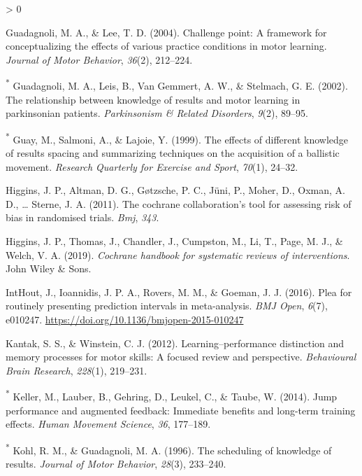 \documentclass[
  english,
  man, donotrepeattitle,mask,floatsintext]{apa7}
\newlength{\cslhangindent}
\newenvironment{CSLReferences}[2] %
 {%
  \setlength{\parindent}{0pt}
  \ifodd #1 \everypar{\setlength{\hangindent}{\cslhangindent}}\ignorespaces\fi
  \ifnum #2 > 0
  \setlength{\parskip}{#2\baselineskip}
  \fi
 }%
 {}
\begin{document}
\begin{CSLReferences}{1}{0}
\leavevmode\hypertarget{ref-Guadagnoli2004}{}%
Guadagnoli, M. A., \& Lee, T. D. (2004). Challenge point: A framework for conceptualizing the effects of various practice conditions in motor learning. \emph{Journal of Motor Behavior}, \emph{36}(2), 212--224.

\leavevmode\hypertarget{ref-Guadagnoli2002}{}%
\textsuperscript{*} Guadagnoli, M. A., Leis, B., Van Gemmert, A. W., \& Stelmach, G. E. (2002). The relationship between knowledge of results and motor learning in parkinsonian patients. \emph{Parkinsonism \& Related Disorders}, \emph{9}(2), 89--95.

\leavevmode\hypertarget{ref-Guay1999}{}%
\textsuperscript{*} Guay, M., Salmoni, A., \& Lajoie, Y. (1999). The effects of different knowledge of results spacing and summarizing techniques on the acquisition of a ballistic movement. \emph{Research Quarterly for Exercise and Sport}, \emph{70}(1), 24--32.

\leavevmode\hypertarget{ref-Higgins2011}{}%
Higgins, J. P., Altman, D. G., Gøtzsche, P. C., Jüni, P., Moher, D., Oxman, A. D., \ldots{} Sterne, J. A. (2011). The cochrane collaboration's tool for assessing risk of bias in randomised trials. \emph{Bmj}, \emph{343}.

\leavevmode\hypertarget{ref-Higgins2019}{}%
Higgins, J. P., Thomas, J., Chandler, J., Cumpston, M., Li, T., Page, M. J., \& Welch, V. A. (2019). \emph{Cochrane handbook for systematic reviews of interventions}. John Wiley \& Sons.

\leavevmode\hypertarget{ref-IntHout2016}{}%
IntHout, J., Ioannidis, J. P. A., Rovers, M. M., \& Goeman, J. J. (2016). Plea for routinely presenting prediction intervals in meta-analysis. \emph{BMJ Open}, \emph{6}(7), e010247. \url{https://doi.org/10.1136/bmjopen-2015-010247}

\leavevmode\hypertarget{ref-Kantak2012}{}%
Kantak, S. S., \& Winstein, C. J. (2012). Learning--performance distinction and memory processes for motor skills: A focused review and perspective. \emph{Behavioural Brain Research}, \emph{228}(1), 219--231.

\leavevmode\hypertarget{ref-Keller2014}{}%
\textsuperscript{*} Keller, M., Lauber, B., Gehring, D., Leukel, C., \& Taube, W. (2014). Jump performance and augmented feedback: Immediate benefits and long-term training effects. \emph{Human Movement Science}, \emph{36}, 177--189.

\leavevmode\hypertarget{ref-Kohl1996}{}%
\textsuperscript{*} Kohl, R. M., \& Guadagnoli, M. A. (1996). The scheduling of knowledge of results. \emph{Journal of Motor Behavior}, \emph{28}(3), 233--240.


\end{CSLReferences}
\end{document}
